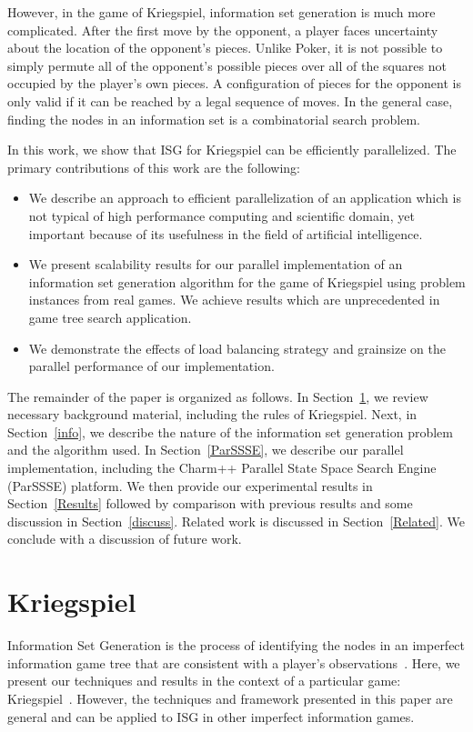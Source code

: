 \documentclass[10pt, conference, compsocconf]{IEEEtran}
\begin{document}
However, in the game of Kriegspiel, information set generation is much more complicated.
After the first move by the opponent, a player faces uncertainty about the
location of the opponent's pieces.  Unlike Poker, it is not possible to simply
permute all of the opponent's possible pieces over all of the squares not
occupied by the player's own pieces.  A configuration of pieces for the
opponent is only valid if it can be reached by a legal sequence of moves.  In
the general case, finding the nodes in an information set is a combinatorial
search problem.

In this work, we show that ISG for Kriegspiel can be efficiently parallelized.
The primary contributions of this work are the following:
\begin{itemize}
\item
 We describe an
approach to efficient parallelization of an application which is not typical of
high performance computing and scientific domain, yet important because of its usefulness in the field of artificial intelligence.
\item
 We present scalability results for our
parallel implementation of an information set generation algorithm for the game
of Kriegspiel using problem instances from real games. We achieve results which are unprecedented in game tree search application. 
\item
We demonstrate
the effects of load balancing strategy and grainsize on the parallel performance of our implementation. 
\end{itemize}

The remainder of the paper is organized as follows.  In Section~\ref{Kriegspiel}, we review
necessary background material, including the rules of Kriegspiel. Next, in
Section~\ref{info}, we describe the nature of the information set generation
problem and the algorithm used.  In Section~\ref{ParSSSE}, we describe our
parallel implementation, including the {\sc Charm++} Parallel State Space
Search Engine (ParSSSE) platform.  We then provide our experimental results in
Section~\ref{Results} followed by comparison with previous results and some discussion in Section~\ref{discuss}.  Related work is discussed in Section~\ref{Related}.  We
conclude with a discussion of future work.


\section{Kriegspiel}\label{Kriegspiel}
Information Set Generation is the process of identifying the nodes in an
imperfect information game tree that are consistent with a player's
observations~\cite{richards12information}. Here, we present our techniques and
results in the context of a particular game: Kriegspiel~\cite{li94chess}.
However, the techniques and framework presented in this paper are general and
can be applied to ISG in other imperfect information games.
\end{document}
